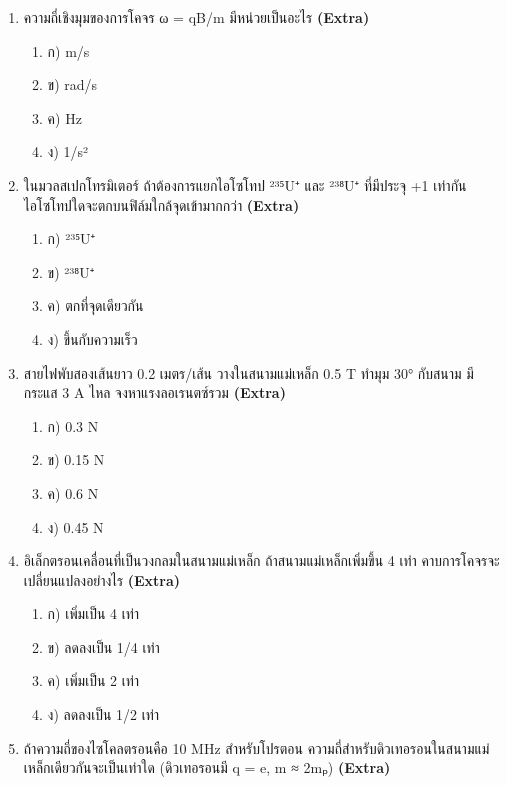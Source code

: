 \documentclass[12pt]{article}
\begin{document}
\begin{enumerate}[label=\arabic*.]
\begin{enumerate}[label=)]
\item ก) 6.4 × 10⁻¹⁴ N
\item ข) 6.4 × 10⁻¹³ N
\item ค) 6.4 × 10⁻¹² N
\item ง) 6.4 × 10⁻¹⁵ N
\end{enumerate}
\item ความถี่เชิงมุมของการโคจร ω = qB/m มีหน่วยเป็นอะไร \hfill \textbf{\small (Extra)}
\begin{enumerate}[label=)]
\item ก) m/s
\item ข) rad/s
\item ค) Hz
\item ง) 1/s²
\end{enumerate}
\item ในมวลสเปกโทรมิเตอร์ ถ้าต้องการแยกไอโซโทป ²³⁵U⁺ และ ²³⁸U⁺ ที่มีประจุ +1 เท่ากัน ไอโซโทปใดจะตกบนฟิล์มใกล้จุดเข้ามากกว่า \hfill \textbf{\small (Extra)}
\begin{enumerate}[label=)]
\item ก) ²³⁵U⁺
\item ข) ²³⁸U⁺
\item ค) ตกที่จุดเดียวกัน
\item ง) ขึ้นกับความเร็ว
\end{enumerate}
\item สายไฟพับสองเส้นยาว 0.2 เมตร/เส้น วางในสนามแม่เหล็ก 0.5 T ทำมุม 30° กับสนาม มีกระแส 3 A ไหล จงหาแรงลอเรนตซ์รวม \hfill \textbf{\small (Extra)}
\begin{enumerate}[label=)]
\item ก) 0.3 N
\item ข) 0.15 N
\item ค) 0.6 N
\item ง) 0.45 N
\end{enumerate}
\item อิเล็กตรอนเคลื่อนที่เป็นวงกลมในสนามแม่เหล็ก ถ้าสนามแม่เหล็กเพิ่มขึ้น 4 เท่า คาบการโคจรจะเปลี่ยนแปลงอย่างไร \hfill \textbf{\small (Extra)}
\begin{enumerate}[label=)]
\item ก) เพิ่มเป็น 4 เท่า
\item ข) ลดลงเป็น 1/4 เท่า
\item ค) เพิ่มเป็น 2 เท่า
\item ง) ลดลงเป็น 1/2 เท่า
\end{enumerate}
\item ถ้าความถี่ของไซโคลตรอนคือ 10 MHz สำหรับโปรตอน ความถี่สำหรับดิวเทอรอนในสนามแม่เหล็กเดียวกันจะเป็นเท่าใด (ดิวเทอรอนมี q = e, m ≈ 2mₚ) \hfill \textbf{\small (Extra)}

\end{enumerate}
\end{document}
